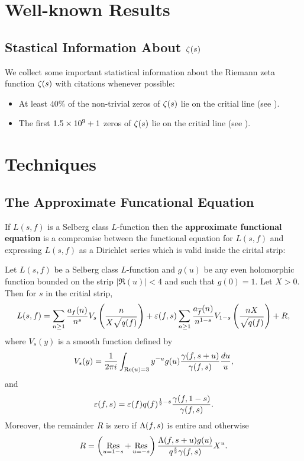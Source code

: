 \documentclass[12pt,oneside]{book}
\begin{document}
  \chapter{Well-known Results}
    \section{Stastical Information About \texorpdfstring{$\zeta(s)$}{z(s)}}
      We collect some important statistical information about the Riemann zeta function $\zeta(s)$ with citations whenever possible:
      \begin{itemize}
        \item At least $40\%$ of the non-trivial zeros of $\zeta(s)$ lie on the critial line (see ).
        \item The first $1.5 \times 10^{9}+1$ zeros of $\zeta(s)$ lie on the critial line (see ).
      \end{itemize}
  \chapter{Techniques}
    \section{The Approximate Funcational Equation}
      If $L(s,f)$ is a Selberg class $L$-function then the \textbf{approximate functional equation} is a compromise between the functional equation for $L(s,f)$ and expressing $L(s,f)$ as a Dirichlet series which is valid inside the cirital strip:

      \begin{theorem}
        Let $L(s,f)$ be a Selberg class $L$-function and $g(u)$ be any even holomorphic function bounded on the strip $|\Re(u)| < 4$ and such that $g(0) = 1$. Let $X > 0$. Then for $s$ in the critial strip,
        \[
          L(s,f) = \sum_{n \ge 1}\frac{a_{f}(n)}{n^{s}}V_{s}\left(\frac{n}{X\sqrt{q(f)}}\right)+\varepsilon(f,s)\sum_{n \ge 1}\frac{a_{\overline{f}}(n)}{n^{1-s}}V_{1-s}\left(\frac{nX}{\sqrt{q(f)}}\right)+R,
        \]
        where $V_{s}(y)$ is a smooth function defined by
        \[
          V_{s}(y) = \frac{1}{2\pi i}\int_{\mathrm{Re}(u) = 3}y^{-u}g(u)\frac{\gamma(f,s+u)}{\gamma(f,s)}\frac{du}{u},
        \]
        and
        \[
          \varepsilon(f,s) = \varepsilon(f)q(f)^{\frac{1}{2}-s}\frac{\gamma(f,1-s)}{\gamma(f,s)}.
        \]
        Moreover, the remainder $R$ is zero if $\Lambda(f,s)$ is entire and otherwise
        \[
          R = \left(\operatorname*{\mathrm{Res}}_{u = 1-s}+\operatorname*{\mathrm{Res}}_{u = -s}\right)\frac{\Lambda(f,s+u)g(u)}{q^{\frac{s}{2}}\gamma(f,s)}X^{u}.
        \]
      \end{theorem}
\end{document}
